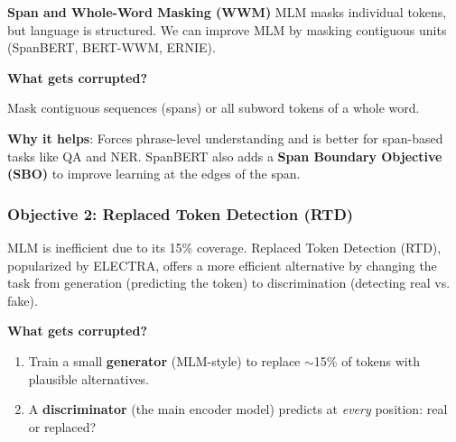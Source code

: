 \documentclass{article}
\begin{document}
\textbf{Span and Whole-Word Masking (WWM)}
MLM masks individual tokens, but language is structured. We can improve MLM by masking contiguous units (SpanBERT, BERT-WWM, ERNIE).

\textbf{What gets corrupted?}

Mask contiguous sequences (spans) or all subword tokens of a whole word.

\begin{center}
\end{center}

\textbf{Why it helps}: Forces phrase-level understanding and is better for span-based tasks like QA and NER. SpanBERT also adds a \textbf{Span Boundary Objective (SBO)} to improve learning at the edges of the span.

\subsubsection{Objective 2: Replaced Token Detection (RTD)}

MLM is inefficient due to its 15\% coverage. Replaced Token Detection (RTD), popularized by ELECTRA, offers a more efficient alternative by changing the task from generation (predicting the token) to discrimination (detecting real vs. fake).

\textbf{What gets corrupted?}

\begin{enumerate}
\item Train a small \textbf{generator} (MLM-style) to replace $\sim$15\% of tokens with plausible alternatives.
\item A \textbf{discriminator} (the main encoder model) predicts at \textit{every} position: real or replaced?
\end{enumerate}
\end{document}
